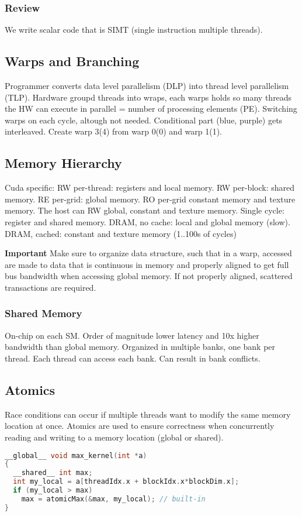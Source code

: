 \documentclass[a4paper, fontsize=8pt, landscape, DIV=1]{scrartcl}
\begin{document}
\begin{multicols*}{4}
  \subsubsection{Review}
  We write scalar code that is SIMT (single instruction multiple threads).

  \subsection{Warps and Branching}
  Programmer converts data level parallelism (DLP) into thread level parallelism (TLP).
  Hardware groupd threads into wraps, each warps holds so many threads the HW can execute
  in parallel = number of processing elements (PE).
  Switching warps on each cycle, altough not needed. Conditional part (blue, purple)
  gets interleaved. Create warp 3(4) from warp 0(0) and warp 1(1).

  \subsection{Memory Hierarchy}
  Cuda specific: RW per-thread: registers and local memory. RW per-block: shared memory.
  RE per-grid: global memory. RO per-grid constant memory and texture memory. The host
  can RW global, constant and texture memory.
  Single cycle: register and shared memory. DRAM, no cache: local and global memory (slow).
  DRAM, cached: constant and texture memory (1..100s of cycles)

  \textbf{Important} Make sure to organize data structure, such that in a warp, accessed are made
  to data that is continuous in memory and properly aligned to get full bus bandwidth when
  accessing global memory. If not properly aligned, scattered transactions are required.

  \subsubsection{Shared Memory}
  On-chip on each SM. Order of magnitude lower latency and 10x higher bandwidth than global
  memory. Organized in multiple banks, one bank per thread. Each thread can access each bank.
  Can result in bank conflicts.

  \subsection{Atomics}
  Race conditions can occur if multiple threads want to modify the same memory location at once. 
  Atomics are used to ensure correctness when concurrently reading and writing to a memory location
  (global or shared). 
\begin{lstlisting}[language=C]
__global__ void max_kernel(int *a)
{
  __shared__ int max;
  int my_local = a[threadIdx.x + blockIdx.x*blockDim.x];
  if (my_local > max)
    max = atomicMax(&max, my_local); // built-in
}\end{lstlisting}


\end{multicols*}
\end{document}
